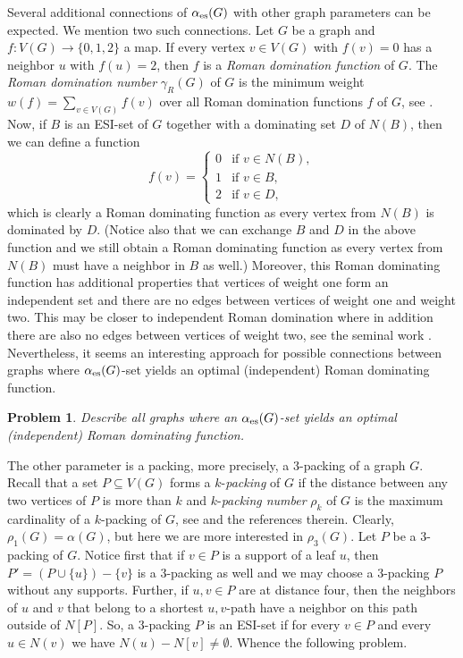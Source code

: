 \documentclass[11pt]{article}
\newtheorem{problem}[theorem]{Problem}
\newcommand{\g}{\gamma}
\newcommand{\es}{\alpha_{\rm es}}
\newcommand{\al}{\alpha}
\begin{document}
Several additional connections of $\es(G)$ with other graph parameters can be expected. We mention two such connections. Let $G$ be a graph and $f:V(G)\rightarrow \{0,1,2\}$ a map. If every vertex $v\in V(G)$ with $f(v)=0$ has a neighbor $u$ with $f(u)=2$, then $f$ is a \emph{Roman domination function} of $G$. The \emph{Roman domination number} $\g_R(G)$ of $G$ is the minimum weight $w(f)=\sum_{v\in V(G)}f(v)$ over all Roman domination functions $f$ of $G$, see \cite{CDHH}. Now, if $B$ is an ESI-set of $G$ together with a dominating set $D$ of $N(B)$, then we can define a function
\begin{equation*}
f(v)=\left\{\begin{array}{ll}
0 & \mbox{if } v\in N(B), \\[0.15cm]
1 & \mbox{if } v\in B, \\[0.15cm]
2 & \mbox{if } v\in D, 
\end{array}\right.
\end{equation*}
which is clearly a Roman dominating function as every vertex from $N(B)$ is dominated by $D$. (Notice also that we can exchange $B$ and $D$ in the above function and we still obtain a Roman dominating function as every vertex from $N(B)$ must have a neighbor in $B$ as well.) Moreover, this Roman dominating function has additional properties that vertices of weight one form an independent set and there are no edges between vertices of weight one and weight two. This may be closer to independent Roman domination where in addition there are also no edges between vertices of weight two, see the seminal work \cite{ATRM}.  Nevertheless, it seems an interesting approach for possible connections between graphs where $\es(G)$-set yields an optimal (independent) Roman dominating function. 

\begin{problem}
Describe all graphs where an $\es(G)$-set yields an optimal (independent) Roman dominating function.
\end{problem}

The other parameter is a packing, more precisely, a $3$-packing of a graph $G$. Recall that a set $P\subseteq V(G)$ forms a $k$-\emph{packing} of $G$ if the distance between any two vertices of $P$ is more than $k$ and $k$-\emph{packing number} $\rho_k$ of $G$ is the maximum cardinality of a $k$-packing of $G$, see \cite{BKPY} and the references therein. Clearly, $\rho_1(G)=\al(G)$, but here we are more interested in $\rho_3(G)$. Let $P$ be a $3$-packing of $G$. Notice first that if $v\in P$ is a support of a leaf $u$, then $P'=(P\cup\{u\})-\{v\}$ is a $3$-packing as well and we may choose a $3$-packing $P$ without any supports. Further, if $u,v\in P$ are at distance four, then the neighbors of $u$ and $v$ that belong to a shortest $u,v$-path have a neighbor on this path outside of $N[P]$. So, a $3$-packing $P$ is an ESI-set if for every $v\in P$ and every $u\in N(v)$ we have $N(u)-N[v]\neq \emptyset$. Whence the following problem.    
\end{document}
